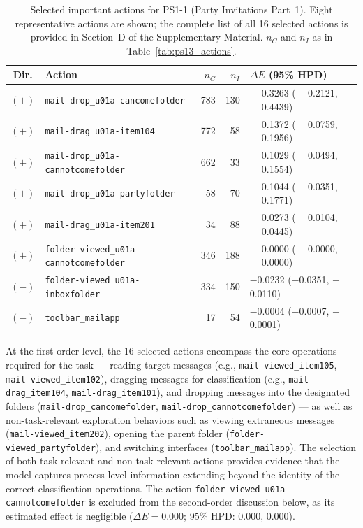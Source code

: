 \begin{table}[htb]
\centering
{\small
\begin{tabular}{clrrl}
\toprule
Dir. & Action & $n_C$ & $n_I$ & $\Delta E$ (95\% HPD) \\
\midrule
$(+)$ & \texttt{mail-drop\_u01a-cancomefolder}     & 783 & 130 & $\phantom{-}$0.3263 ($\phantom{-}$0.2121, $\phantom{-}$0.4439) \\
$(+)$ & \texttt{mail-drag\_u01a-item104}           & 772 &  58 & $\phantom{-}$0.1372 ($\phantom{-}$0.0759, $\phantom{-}$0.1956) \\
$(+)$ & \texttt{mail-drop\_u01a-cannotcomefolder}  & 662 &  33 & $\phantom{-}$0.1029 ($\phantom{-}$0.0494, $\phantom{-}$0.1554) \\
$(+)$ & \texttt{mail-drop\_u01a-partyfolder}       &  58 &  70 & $\phantom{-}$0.1044 ($\phantom{-}$0.0351, $\phantom{-}$0.1771) \\
$(+)$ & \texttt{mail-drag\_u01a-item201}           &  34 &  88 & $\phantom{-}$0.0273 ($\phantom{-}$0.0104, $\phantom{-}$0.0445) \\
$(+)$ & \texttt{folder-viewed\_u01a-cannotcomefolder} & 346 & 188 & $\phantom{-}$0.0000 ($\phantom{-}$0.0000, $\phantom{-}$0.0000) \\
$(-)$ & \texttt{folder-viewed\_u01a-inboxfolder}  & 334 & 150 & $-$0.0232 ($-$0.0351, $-$0.0110) \\
$(-)$ & \texttt{toolbar\_mailapp}                 &  17 &  54 & $-$0.0004 ($-$0.0007, $-$0.0001) \\
\bottomrule
\end{tabular}
}
\caption{Selected important actions for PS1-1 (Party Invitations Part~1). Eight representative actions are shown; the complete list of all 16 selected actions is provided in Section~D of the Supplementary Material. $n_C$ and $n_I$ as in Table~\ref{tab:ps13_actions}.}
\label{tab:ps11_actions}
\end{table}

At the first-order level, the 16 selected actions encompass the core operations required for the task --- reading target messages (e.g., \texttt{mail-viewed\_item105}, \texttt{mail-viewed\_item102}), dragging messages for classification (e.g., \texttt{mail-drag\_item104}, \texttt{mail-drag\_item101}), and dropping messages into the designated folders (\texttt{mail-drop\_cancomefolder}, \texttt{mail-drop\_cannotcomefolder}) --- as well as non-task-relevant exploration behaviors such as viewing extraneous messages (\texttt{mail-viewed\_item202}), opening the parent folder (\texttt{folder-viewed\_partyfolder}), and switching interfaces (\texttt{toolbar\_mailapp}). The selection of both task-relevant and non-task-relevant actions provides evidence that the model captures process-level information extending beyond the identity of the correct classification operations. The action \texttt{folder-viewed\_u01a-cannotcomefolder} is excluded from the second-order discussion below, as its estimated effect is negligible ($\Delta E = 0.000$; 95\% HPD: 0.000, 0.000).

